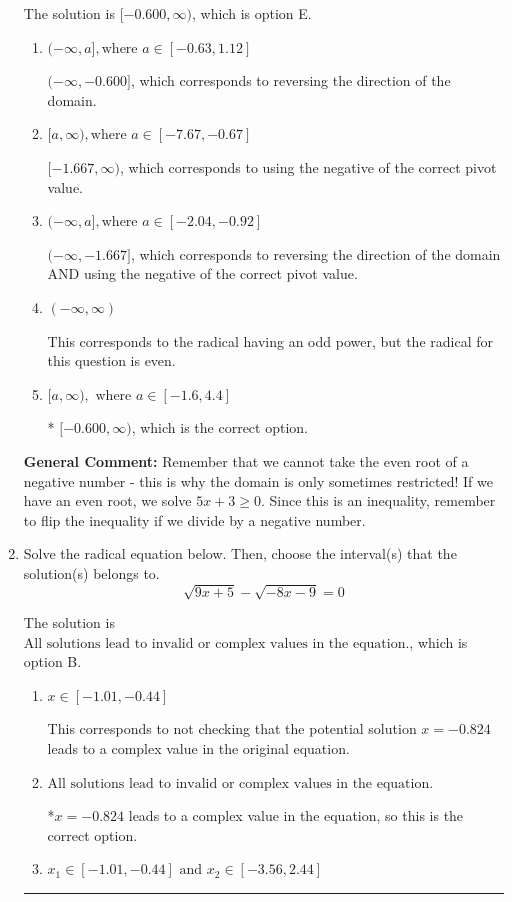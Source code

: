 \documentclass{extbook}[14pt]
\newcommand{\litem}[1]{\item #1

\rule{\textwidth}{0.4pt}}
\begin{document}
\begin{enumerate}
{The solution is \( [-0.600, \infty) \), which is option E.\begin{enumerate}[label=\Alph*.]
\item \( (-\infty, a], \text{where } a \in [-0.63, 1.12] \)

 $(-\infty, -0.600]$, which corresponds to reversing the direction of the domain.
\item \( [a, \infty), \text{where } a \in [-7.67, -0.67] \)

$[-1.667, \infty)$, which corresponds to using the negative of the correct pivot value.
\item \( (-\infty, a], \text{where } a \in [-2.04, -0.92] \)

$(-\infty, -1.667]$, which corresponds to reversing the direction of the domain AND using the negative of the correct pivot value.
\item \( (-\infty, \infty) \)

This corresponds to the radical having an odd power, but the radical for this question is even.
\item \( [a, \infty), \text{ where } a \in [-1.6, 4.4] \)

* $[-0.600, \infty)$, which is the correct option.
\end{enumerate}

\textbf{General Comment:} Remember that we cannot take the even root of a negative number - this is why the domain is only sometimes restricted! If we have an even root, we solve $5 x + 3 \geq 0$. Since this is an inequality, remember to flip the inequality if we divide by a negative number.
}
\litem{
Solve the radical equation below. Then, choose the interval(s) that the solution(s) belongs to.
\[ \sqrt{9 x + 5} - \sqrt{-8 x - 9} = 0 \]

The solution is \( \text{All solutions lead to invalid or complex values in the equation.} \), which is option B.\begin{enumerate}[label=\Alph*.]
\item \( x \in [-1.01,-0.44] \)

This corresponds to not checking that the potential solution $x = -0.824$ leads to a complex value in the original equation.
\item \( \text{All solutions lead to invalid or complex values in the equation.} \)

*$x = -0.824$ leads to a complex value in the equation, so this is the correct option.
\item \( x_1 \in [-1.01, -0.44] \text{ and } x_2 \in [-3.56,2.44] \)


\end{enumerate}}
\end{enumerate}
\end{document}
